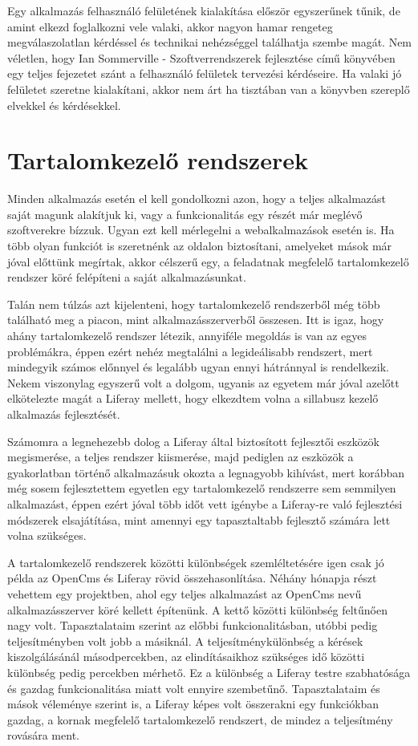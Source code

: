\documentclass[hidelinks, 12pt, a4paper]{report}
\begin{document}
Egy alkalmazás felhasználó felületének kialakítása először egyszerűnek tűnik, de amint elkezd foglalkozni vele valaki, akkor nagyon hamar rengeteg megválaszolatlan kérdéssel és technikai nehézséggel találhatja szembe magát. Nem véletlen, hogy Ian Sommerville - Szoftverrendszerek fejlesztése című \cite{szoftverrendszerek-fejlesztese} könyvében egy teljes fejezetet szánt a felhasználó felületek tervezési kérdéseire. Ha valaki jó felületet szeretne kialakítani, akkor nem árt ha tisztában van a könyvben szereplő elvekkel és kérdésekkel.

\section{Tartalomkezelő rendszerek}

Minden alkalmazás esetén el kell gondolkozni azon, hogy a teljes alkalmazást saját magunk alakítjuk ki, vagy a funkcionalitás egy részét már meglévő szoftverekre bízzuk. Ugyan ezt kell mérlegelni a webalkalmazások esetén is. Ha több olyan funkciót is szeretnénk az oldalon biztosítani, amelyeket mások már jóval előttünk megírtak, akkor célszerű egy, a feladatnak megfelelő tartalomkezelő rendszer köré felépíteni a saját alkalmazásunkat.

Talán nem túlzás azt kijelenteni, hogy tartalomkezelő rendszerből még több található meg a piacon, mint alkalmazásszerverből összesen. Itt is igaz, hogy ahány tartalomkezelő rendszer létezik, annyiféle megoldás is van az egyes problémákra, éppen ezért nehéz megtalálni a legideálisabb rendszert, mert mindegyik számos előnnyel és legalább ugyan ennyi hátránnyal is rendelkezik. Nekem viszonylag egyszerű volt a dolgom, ugyanis az egyetem már jóval azelőtt elkötelezte magát a Liferay mellett, hogy elkezdtem volna a sillabusz kezelő alkalmazás fejlesztését.

Számomra a legnehezebb dolog a Liferay által biztosított fejlesztői eszközök megismerése, a teljes rendszer kiismerése, majd pediglen az eszközök a gyakorlatban történő alkalmazásuk okozta a legnagyobb kihívást, mert korábban még sosem fejlesztettem egyetlen egy tartalomkezelő rendszerre sem semmilyen alkalmazást, éppen ezért jóval több időt vett igénybe a Liferay-re való fejlesztési módszerek elsajátítása, mint amennyi egy tapasztaltabb fejlesztő számára lett volna szükséges.

A tartalomkezelő rendszerek közötti különbségek szemléltetésére igen csak jó példa az OpenCms és Liferay rövid összehasonlítása. Néhány hónapja részt vehettem egy projektben, ahol egy teljes alkalmazást az OpenCms nevű alkalmazásszerver köré kellett építenünk. A kettő közötti különbség feltűnően nagy volt. Tapasztalataim szerint az előbbi funkcionalitásban, utóbbi pedig teljesítményben volt jobb a másiknál. A teljesítménykülönbség a kérések kiszolgálásánál másodpercekben, az elindításaikhoz szükséges idő közötti különbség pedig percekben mérhető. Ez a különbség a Liferay testre szabhatósága és gazdag funkcionalitása miatt volt ennyire szembetűnő. Tapasztalataim és mások véleménye szerint is, a Liferay képes volt összerakni egy funkciókban gazdag, a kornak megfelelő tartalomkezelő rendszert, de mindez a teljesítmény rovására ment.
\end{document}
